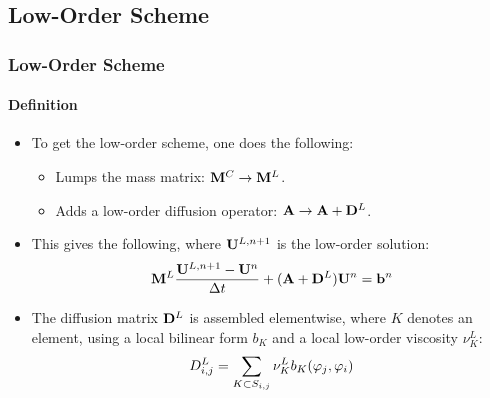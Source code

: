 \documentclass{beamer}
\begin{document}
\subsection{Low-Order Scheme}
\begin{frame}
\frametitle{Low-Order Scheme}
\framesubtitle{Definition}

\begin{itemize}
   \item To get the low-order scheme, one does the following:
   \begin{itemize}
      \item Lumps the mass matrix:
        $\mathbf{M}^C\rightarrow\mathbf{M}^L$.
      \item Adds a low-order diffusion operator:
        $\ssmatrix \rightarrow \ssmatrix+\loworderdiffusionmatrix$.
   \end{itemize}
   \item This gives the following, where $\mathbf{U}^{L,n+1}$ is the low-order solution:
   \begin{equation}
      \lumpedmassmatrix\frac{\solutionvector^{L,n+1}-\solutionvector^n}{\dt}
        + (\ssmatrix + \diffusionmatrix^L)\solutionvector^n = \ssrhs^n
   \end{equation}
   \item The diffusion matrix $\diffusionmatrix^L$ is assembled elementwise,
      where $K$ denotes an element, using a local bilinear form $b_K$ and a
      local low-order viscosity $\nu_K^L$:
   \begin{equation}
      D_{i,j}^L = \sum\limits_{K\subset S_{i,j}}\nu_K^L b_K(\varphi_j,\varphi_i)
   \end{equation}
\end{itemize}

\end{frame}
\end{document}
